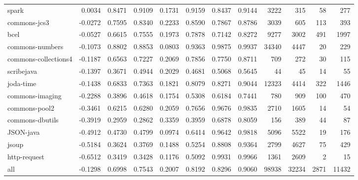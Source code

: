 \begin{table*}
\begin{tabular}{lrrrrrrrrrrr}
                  spark &      0.0034 &  0.8471 &     0.9109 &     0.1731 &  0.9159 &     0.8437 &   0.9144 &   3222 &    315 &    58 &    277 \\
           commons-jcs3 &     -0.0272 &  0.7595 &     0.8340 &     0.2233 &  0.8590 &     0.7867 &   0.8786 &   3039 &    605 &   113 &    393 \\
                   bcel &     -0.0527 &  0.6615 &     0.7555 &     0.1973 &  0.7878 &     0.7142 &   0.8272 &   9277 &   3002 &   491 &   1997 \\
        commons-numbers &     -0.1073 &  0.8802 &     0.8853 &     0.0803 &  0.9363 &     0.9875 &   0.9937 &  34340 &   4447 &    20 &    229 \\
   commons-collections4 &     -0.1187 &  0.6563 &     0.7227 &     0.2069 &  0.7856 &     0.7750 &   0.8711 &    709 &    272 &    30 &    115 \\
             scribejava &     -0.1397 &  0.3671 &     0.4944 &     0.2029 &  0.4681 &     0.5068 &   0.5645 &     44 &     45 &    14 &     55 \\
              joda-time &     -0.1438 &  0.6833 &     0.7363 &     0.1821 &  0.8079 &     0.8271 &   0.9044 &  12323 &   4414 &   322 &   1446 \\
        commons-imaging &     -0.2288 &  0.3896 &     0.4618 &     0.1754 &  0.5308 &     0.6184 &   0.7441 &    780 &    909 &   100 &    470 \\
          commons-pool2 &     -0.3461 &  0.6215 &     0.6280 &     0.2059 &  0.7656 &     0.9676 &   0.9835 &   2710 &   1605 &    14 &     54 \\
        commons-dbutils &     -0.3919 &  0.2959 &     0.2862 &     0.3359 &  0.3959 &     0.6878 &   0.8059 &    156 &    389 &    44 &     87 \\
              JSON-java &     -0.4912 &  0.4730 &     0.4799 &     0.0974 &  0.6414 &     0.9642 &   0.9818 &   5096 &   5522 &    19 &    176 \\
                  jsoup &     -0.5184 &  0.3624 &     0.3769 &     0.1488 &  0.5254 &     0.8808 &   0.9364 &   2799 &   4627 &    75 &    429 \\
           http-request &     -0.6512 &  0.3419 &     0.3428 &     0.1176 &  0.5092 &     0.9931 &   0.9966 &   1361 &   2609 &     2 &     15 \\
                    all &     -0.1298 &  0.6998 &     0.7543 &     0.2007 &  0.8192 &     0.8296 &   0.9060 &  98938 &  32234 &  2871 &  11432 \\
\bottomrule
\end{tabular}
\end{table*}
